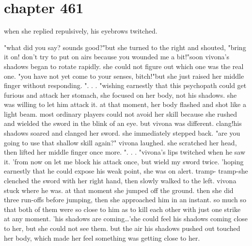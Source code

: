 \section{chapter 461}

when she replied repulsively, his eyebrows twitched.





"what did you say? sounds good?"but she turned to the right and shouted, "bring it on! don't try to put on airs because you wounded me a bit!"soon vivona's shadows began to rotate rapidly.
 she could not figure out which one was the real one.
"you have not yet come to your senses, bitch!"but she just raised her middle finger without responding.
".
.
.
"wishing earnestly that this psychopath could get furious and attack her stomach, she focused on her body, not his shadows.
 she was willing to let him attack it.
at that moment, her body flashed and shot like a light beam.
 most ordinary players could not avoid her skill because she rushed and wielded the sword in the blink of an eye.
 but vivona was different.
clang!his shadows soared and clanged her sword.
 she immediately stepped back.
"are you going to use that shallow skill again?" vivona laughed.
she scratched her head, then lifted her middle finger once more.
".
.
.
"vivona's lips twitched when he saw it.
'from now on let me block his attack once, but wield my sword twice.
'hoping earnestly that he could expose his weak point, she was on alert.
tramp- tramp-she clenched the sword with her right hand, then slowly walked to the left.
vivona stuck where he was.
at that moment she jumped off the ground.
 then she did three run-offs before jumping, then she approached him in an instant.
 so much so that both of them were so close to him as to kill each other with just one strike at any moment.
'his shadows are coming…'she could feel his shadows coming close to her, but she could not see them.
but the air his shadows pushed out touched her body, which made her feel something was getting close to her.


